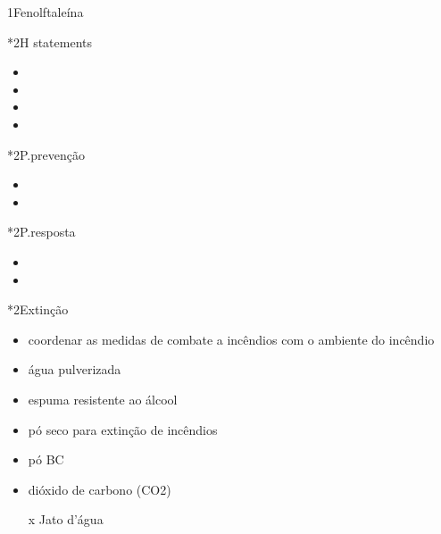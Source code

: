 \begin{sectionBox}1{Fenolftaleína}

    \begin{sectionBox}{}
        \begin{multicols}{3}
        \end{multicols}
    \end{sectionBox}

    \begin{sectionBox}*2{H statements}
        \begin{itemize}
            \item {}
            \item {}
            \item {}
            \item {}
        \end{itemize}
    \end{sectionBox}

    \begin{sectionBox}*2{P.prevenção}
        \begin{itemize}
            \item {}
            \item {}
        \end{itemize}
    \end{sectionBox}

    \begin{sectionBox}*2{P.resposta}
        \begin{itemize}
            \item {}
            \item {}
        \end{itemize}
    \end{sectionBox}

    \begin{sectionBox}*2{Extinção}
        \begin{itemize}
            \item coordenar as medidas de combate a incêndios com o ambiente do incêndio
            \item água pulverizada
            \item espuma resistente ao álcool
            \item pó seco para extinção de incêndios
            \item pó BC
            \item dióxido de carbono (CO2)
            \item[x] Jato d'água
        \end{itemize}
    \end{sectionBox}


\end{sectionBox}
